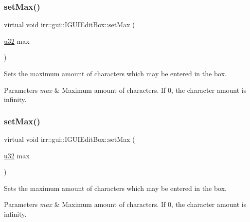 \subsubsection{\texorpdfstring{set\+Max()}{setMax()}\hspace{0.1cm}{\footnotesize\ttfamily [1/2]}}
{\footnotesize\ttfamily virtual void irr\+::gui\+::\+I\+G\+U\+I\+Edit\+Box\+::set\+Max (\begin{DoxyParamCaption}\item[{\hyperlink{namespaceirr_a0416a53257075833e7002efd0a18e804}{u32}}]{max }\end{DoxyParamCaption})\hspace{0.3cm}{\ttfamily [pure virtual]}}



Sets the maximum amount of characters which may be entered in the box. 


\begin{DoxyParams}{Parameters}
{\em max} & Maximum amount of characters. If 0, the character amount is infinity. \\
\hline
\end{DoxyParams}
\mbox{\label{classirr_1_1gui_1_1IGUIEditBox_a5253ed6b422e129356e56f8e2a610be5}} 
\subsubsection{\texorpdfstring{set\+Max()}{setMax()}\hspace{0.1cm}{\footnotesize\ttfamily [2/2]}}
{\footnotesize\ttfamily virtual void irr\+::gui\+::\+I\+G\+U\+I\+Edit\+Box\+::set\+Max (\begin{DoxyParamCaption}\item[{\hyperlink{namespaceirr_a0416a53257075833e7002efd0a18e804}{u32}}]{max }\end{DoxyParamCaption})\hspace{0.3cm}{\ttfamily [pure virtual]}}



Sets the maximum amount of characters which may be entered in the box. 


\begin{DoxyParams}{Parameters}
{\em max} & Maximum amount of characters. If 0, the character amount is infinity. \\
\hline
\end{DoxyParams}
\mbox{\label{classirr_1_1gui_1_1IGUIEditBox_a0f68dc7ddc74d8103ba3ba4d445dbf9a}} 
